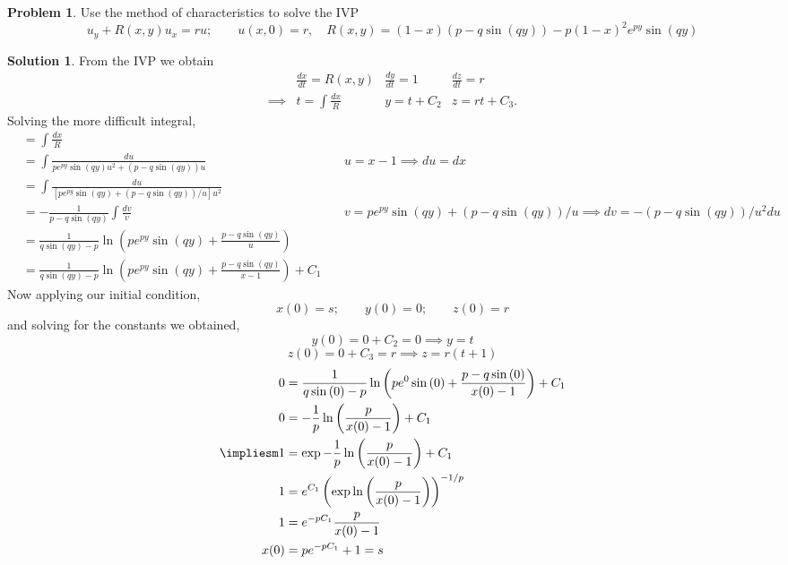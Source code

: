 \documentclass[10pt]{article}
\theoremstyle{definition}
\newtheorem{problem}{Problem}
\newtheorem{soln}{Solution}
\newcommand{\justif}[2]{&{#1}&\text{#2}}
\begin{document}
\begin{problem}
Use the method of characteristics to solve the IVP
$$u_y+R(x,y)u_x=ru;\qquad u(x,0)=r,\quad R(x,y)=\left(1-x\right)\left(p-q\sin\left(qy\right)\right)-p\left(1-x\right)^2e^{py}\sin\left(qy\right)$$
\end{problem}
\begin{soln}
  From the IVP we obtain
  \begin{align*}
             & \frac{dx}{dt}=R(x,y) & \frac{dy}{dt}=1 & \frac{dz}{dt}=r \\
    \implies & t=\int\frac{dx}{R}   & y=t+C_2         & z=rt+C_3.
  \end{align*}
  Solving the more difficult integral,
  \begin{align*}
     & =\int\frac{dx}{R}                                                                                                  \\
     & =\int\frac{du}{pe^{py}\sin\left(qy\right)u^2+(p-q\sin\left(qy\right))u}\justif{\>}{$u=x-1\implies du=dx$}          \\
     & =\int\frac{du}{\left[pe^{py}\sin\left(qy\right)+(p-q\sin\left(qy\right))/u\right]u^2}                              \\
     & =-\frac{1}{p-q\sin\left(qy\right)}\int\frac{dv}{v}
    \justif{\>}{$v=pe^{py}\sin\left(qy\right)+(p-q\sin\left(qy\right))/u\implies dv=-(p-q\sin\left(qy\right))/u^2 du$}    \\
     & =\frac{1}{q\sin\left(qy\right)-p}\ln\left(pe^{py}\sin\left(qy\right)+\frac{p-q\sin\left(qy\right)}{u}\right)       \\
     & =\frac{1}{q\sin\left(qy\right)-p}\ln\left(pe^{py}\sin\left(qy\right)+\frac{p-q\sin\left(qy\right)}{x-1}\right)+C_1
  \end{align*}
  Now applying our initial condition,
  $$x(0)=s;\qquad y(0)=0;\qquad z(0)=r$$
  and solving for the constants we obtained,
  $$y(0)=0+C_2=0\implies y=t$$
  $$z(0)=0+C_3=r\implies z=r\left(t+1\right)$$
  \begin{align*}
    0&=\frac{1}{q\sin\left(0\right)-p}\ln\left(pe^{0}\sin\left(0\right)+\frac{p-q\sin\left(0\right)}{x(0)-1}\right)+C_1\\
    0&=-\frac{1}{p}\ln\left(\frac{p}{x(0)-1}\right)+C_1\\
    \impliesm1&=\exp -\frac{1}{p}\ln\left(\frac{p}{x(0)-1}\right)+C_1\\
    1&=e^{C_1}\left(\exp \ln\left(\frac{p}{x(0)-1}\right)\right)^{-1/p}\\
    1&=e^{-pC_1}\frac{p}{x(0)-1}\\
    x(0)&=pe^{-pC_1}+1=s\\
  \end{align*}
\end{soln}
\end{document}
